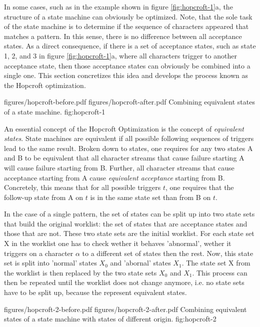 In some cases, such as in the example shown in figure \ref{fig:hopcroft-1}a,
the structure of a state machine can obviously be optimized.
Note, that the sole task of the state machine is to determine
if the sequence of characters appeared that matches a pattern.
In this sense, there is no difference between all acceptance
states. As a direct consequence, if there is a set of acceptance
states, such as state 1, 2, and 3 in figure \ref{fig:hopcroft-1}a, where all characters 
trigger to another acceptance state, then those acceptance states
can obviously be combined into a single one. This section
concretizes this idea and develops the process known as 
the Hopcroft optimization.

\showdpich
{figures/hopcroft-before.pdf}
{figures/hopcroft-after.pdf}
{Combining equivalent states of a state machine.}
{fig:hopcroft-1}

An essential concept of the Hopcroft Optimization is the concept of {\it
    equivalent states}. State machines are equivalent if all possible following
    sequences of triggers lead to the same result.  Broken down to states, one
    requires for any two states A and B to be equivalent that all character
    streams that cause failure starting A will cause failure starting from B.
    Further, all character streams that cause acceptance starting from A cause
{\it equivalent acceptance} starting from B. Concretely, this means
that for all possible triggers $t$, one requires that the follow-up state
from A on $t$ is in the same state set than from B on $t$.

In the case of a single pattern, the set of states can be split up into 
two state sets that build the original worklist: the set of states that are 
acceptance states and those that are not. These two state sets are the initial
worklist. For each state set X in the worklist one has to check wether it
behaves 'abnormal', wether it triggers on a character $\alpha$ to a different
set of states then the rest. Now, this state set is split into 'normal' states $X_0$
and 'abornal' states $X_1$. The state set X from the worklist is then
replaced by the two state sets $X_0$ and $X_1$. This process can then be 
repeated until the worklist does not change anymore, i.e. no state sets 
have to be split up, because the represent equivalent states.

\showdpich
{figures/hopcroft-2-before.pdf}
{figures/hopcroft-2-after.pdf}
{Combining equivalent states of a state machine with states of different origin.}
{fig:hopcroft-2}

